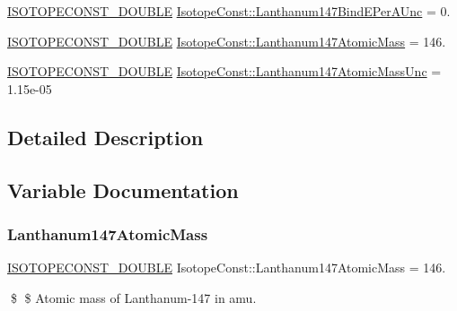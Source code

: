 \begin{DoxyCompactItemize}
\mbox{\hyperlink{group___isotope_const-_macros_ga8f45a7272ce02c0b4c65c44636ed719a}{I\+S\+O\+T\+O\+P\+E\+C\+O\+N\+S\+T\+\_\+\+D\+O\+U\+B\+LE}} \mbox{\hyperlink{group___isotope_const-_lanthanum-_la147_ga5d34c39385493983a7f408643a86a7f0}{Isotope\+Const\+::\+Lanthanum147\+Bind\+E\+Per\+A\+Unc}} = 0.
\item 
\mbox{\hyperlink{group___isotope_const-_macros_ga8f45a7272ce02c0b4c65c44636ed719a}{I\+S\+O\+T\+O\+P\+E\+C\+O\+N\+S\+T\+\_\+\+D\+O\+U\+B\+LE}} \mbox{\hyperlink{group___isotope_const-_lanthanum-_la147_ga58541ba4b9ec6e4d5c044aee41313a52}{Isotope\+Const\+::\+Lanthanum147\+Atomic\+Mass}} = 146.
\item 
\mbox{\hyperlink{group___isotope_const-_macros_ga8f45a7272ce02c0b4c65c44636ed719a}{I\+S\+O\+T\+O\+P\+E\+C\+O\+N\+S\+T\+\_\+\+D\+O\+U\+B\+LE}} \mbox{\hyperlink{group___isotope_const-_lanthanum-_la147_gae670ef2b0e649c245157e0467e38cee9}{Isotope\+Const\+::\+Lanthanum147\+Atomic\+Mass\+Unc}} = 1.\+15e-\/05
\end{DoxyCompactItemize}


\subsection{Detailed Description}


\subsection{Variable Documentation}
\mbox{\label{group___isotope_const-_lanthanum-_la147_ga58541ba4b9ec6e4d5c044aee41313a52}} 
\subsubsection{\texorpdfstring{Lanthanum147\+Atomic\+Mass}{Lanthanum147AtomicMass}}
{\footnotesize\ttfamily \mbox{\hyperlink{group___isotope_const-_macros_ga8f45a7272ce02c0b4c65c44636ed719a}{I\+S\+O\+T\+O\+P\+E\+C\+O\+N\+S\+T\+\_\+\+D\+O\+U\+B\+LE}} Isotope\+Const\+::\+Lanthanum147\+Atomic\+Mass = 146.}

\$ \$ Atomic mass of Lanthanum-\/147 in amu. \mbox{\label{group___isotope_const-_lanthanum-_la147_gae670ef2b0e649c245157e0467e38cee9}} 
